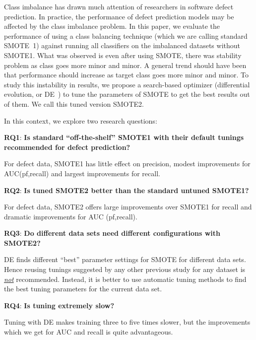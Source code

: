\documentclass[sigconf]{acmart}
\theoremstyle{break}
\begin{document}
Class imbalance has drawn much attention of researchers in software defect prediction. In practice, the performance of defect prediction models may be affected by the class imbalance problem. In this paper, we evaluate the performance of using a class balancing technique (which we are calling standard SMOTE~1\cite{chawla2002smote}) against running all classifiers on the imbalanced datasets without SMOTE1. What was observed is even after using SMOTE, there was stability problem as class goes more minor and minor. A general trend should have been that performance should increase as target class goes more minor and minor. To study this instability in results, we propose a search-based optimizer (differential evolution, or DE~\cite{storn1997differential}) to tune the parameters of SMOTE to get the best results out of them.
We call this tuned version SMOTE2.

In this context, we explore two research questions:  
 
  \textbf{RQ1}: \textbf{Is standard ``off-the-shelf'' SMOTE1 with their default tunings recommended for defect prediction?} 

 \begin{lesson}For defect data, SMOTE1 has little effect on 
 precision, modest improvements for AUC(pf,recall) and largest improvements for recall.
 \end{lesson}

 \textbf{RQ2}: \textbf{Is tuned SMOTE2 better than the standard untuned SMOTE1?} 
 
 \begin{lesson}For defect data, SMOTE2  
 offers   large  improvements over SMOTE1 for recall
 and dramatic improvements for AUC (pf,recall).
 \end{lesson}
 
 \textbf{RQ3}: \textbf{Do different data sets
      need different configurations with SMOTE2?} 
 
 \begin{lesson}DE finds different ``best'' parameter settings for SMOTE for different data sets. Hence reusing tunings  suggested  by  any other  previous study  for any dataset is \underline{{\em not}} recommended. Instead,  it is better to
      use automatic tuning  methods  to find the best tuning parameters for the current data set.
 \end{lesson}
   \textbf{RQ4}: \textbf{Is tuning extremely slow?} 
 
 \begin{lesson}Tuning with DE makes training three to five times slower, but the improvements which we get for AUC and recall is quite advantageous.
 \end{lesson}
 
\end{document}
